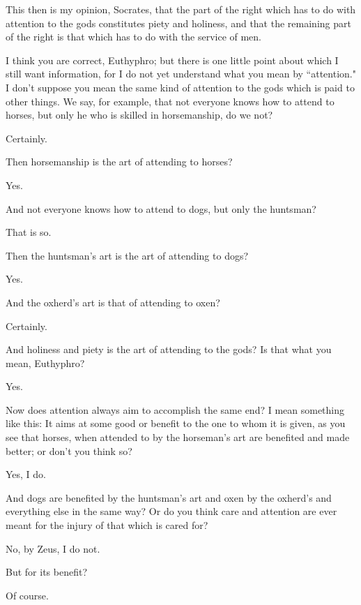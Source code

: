 \documentclass[letterpaper,12pt]{article}
\newcommand{\stephpag}[1]{\marginnote{\small\itshape\fontfamily{ppl}\selectfont #1}}
\begin{document}
\begin{drama}
\euthyphrospeaks
This then is my opinion, Socrates, that the part of the right which has to do with attention to the gods constitutes piety and holiness, and that the remaining part of the right is that which has to do with the service of men.

\socratesspeaks
I think you are correct, Euthyphro; \stephpag{13 a} but there is one little point about which I still want information, for I do not yet understand what you mean by ``attention." I don't suppose you mean the same kind of attention to the gods which is paid to other things. We say, for example, that not everyone knows how to attend to horses, but only he who is skilled in horsemanship, do we not?

\euthyphrospeaks
Certainly.

\socratesspeaks
Then horsemanship is the art of attending to horses?

\euthyphrospeaks
Yes.

\socratesspeaks
And not everyone knows how to attend to dogs, but only the huntsman?

\euthyphrospeaks
That is so.

\socratesspeaks
Then the huntsman's art is the art of attending to dogs? \stephpag{b}

\euthyphrospeaks
Yes.

\socratesspeaks
And the oxherd's art is that of attending to oxen?

\euthyphrospeaks
Certainly.

\socratesspeaks
And holiness and piety is the art of attending to the gods? Is that what you mean, Euthyphro?

\euthyphrospeaks
Yes.

\socratesspeaks
Now does attention always aim to accomplish the same end? I mean something like this: It aims at some good or benefit to the one to whom it is given, as you see that horses, when attended to by the horseman's art are benefited and made better; or don't you think so?

\euthyphrospeaks
Yes, I do.

\socratesspeaks
And dogs are benefited by the huntsman's art \stephpag{c} and oxen by the oxherd's and everything else in the same way? Or do you think care and attention are ever meant for the injury of that which is cared for?

\euthyphrospeaks
No, by Zeus, I do not.

\socratesspeaks
But for its benefit?

\euthyphrospeaks
Of course.


\end{drama}
\end{document}
